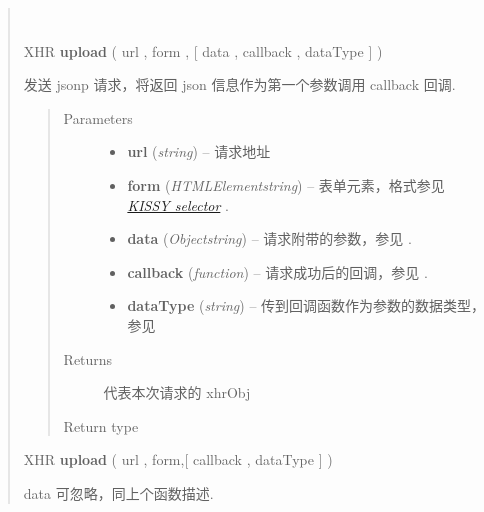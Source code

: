 \documentclass[letterpaper,10pt,english]{sphinxmanual}
\begin{document}
\begin{quote}
\begin{fulllineitems}
\label{api/core/ajax/upload:io.upload}~
\begin{DUlineblock}{0em}
\item[] XHR \textbf{upload} ( url , form , {[} data , callback , dataType {]} )
\item[] 发送 jsonp 请求，将返回 json 信息作为第一个参数调用 callback 回调.
\end{DUlineblock}
\begin{quote}\begin{description}
\item[{Parameters}] \leavevmode\begin{itemize}
\item {}
\textbf{url} (\emph{string}) -- 请求地址

\item {}
\textbf{form} (\emph{HTMLElement\textbar{}string}) -- 表单元素，格式参见 {\hyperref[api/core/dom/selector:dom-selector]{\emph{KISSY selector}}} .

\item {}
\textbf{data} (\emph{Object\textbar{}string}) -- 请求附带的参数，参见 {\hyperref[api/core/ajax/io:io.cfg.data]{}} .

\item {}
\textbf{callback} (\emph{function}) -- 请求成功后的回调，参见 {\hyperref[api/core/ajax/io:io.cfg.success]{}} .

\item {}
\textbf{dataType} (\emph{string}) -- 传到回调函数作为参数的数据类型，参见 {\hyperref[api/core/ajax/io:io.cfg.dataType]{}}

\end{itemize}

\item[{Returns}] \leavevmode
代表本次请求的 xhrObj

\item[{Return type}] \leavevmode
{\hyperref[api/core/ajax/xhr:io.XhrObj]{}}

\end{description}\end{quote}

\begin{DUlineblock}{0em}
\item[] XHR \textbf{upload} ( url , form,{[} callback , dataType {]} )
\item[] data 可忽略，同上个函数描述.
\end{DUlineblock}


\end{fulllineitems}
\end{quote}
\end{document}
